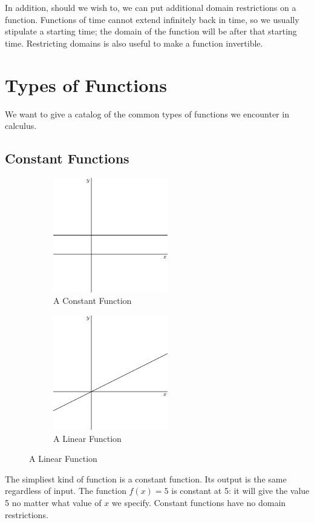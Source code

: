 \documentclass[fleqn]{report}
\begin{document}
In addition, should we wish to, we can put additional domain
restrictions on a function. Functions of time cannot extend
infinitely back in time, so we usually stipulate a starting
time; the domain of the function will be after that starting
time. Restricting domains is also useful to make a function
invertible.

\section*{Types of Functions}

We want to give a catalog of the common types of functions we
encounter in calculus.

\subsection*{Constant Functions}

\begin{figure}[t]
\centering
\begin{subfigure}{.5\textwidth}
 \centering
 \includegraphics[width=5cm]{figure26.eps}
 \caption{A Constant Function}
\end{subfigure}%
\begin{subfigure}{.5\textwidth}
 \centering
 \includegraphics[width=5cm]{figure27.eps}
 \caption{A Linear Function}
\end{subfigure}
\label{Types of Functions 1}
\end{figure}

The simpliest kind of function is a constant function. Its
output is the same regardless of input. The function
$f(x) = 5$ is constant at 5: it will give the value 5 no
matter what value of $x$ we specify. Constant functions have
no domain restrictions.
\end{document}
